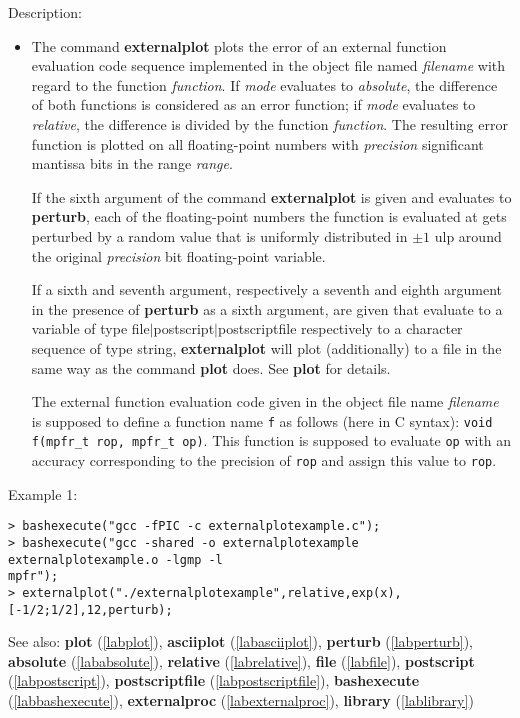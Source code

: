 \noindent Description: \begin{itemize}

\item The command \textbf{externalplot} plots the error of an external function
   evaluation code sequence implemented in the object file named
   \emph{filename} with regard to the function \emph{function}.  If \emph{mode}
   evaluates to \emph{absolute}, the difference of both functions is
   considered as an error function; if \emph{mode} evaluates to \emph{relative},
   the difference is divided by the function \emph{function}. The resulting
   error function is plotted on all floating-point numbers with
   \emph{precision} significant mantissa bits in the range \emph{range}. 
    
   If the sixth argument of the command \textbf{externalplot} is given and evaluates to
   \textbf{perturb}, each of the floating-point numbers the function is evaluated at gets perturbed by a
   random value that is uniformly distributed in $\pm1$ ulp
   around the original \emph{precision} bit floating-point variable.
    
   If a sixth and seventh argument, respectively a seventh and eighth
   argument in the presence of \textbf{perturb} as a sixth argument, are given
   that evaluate to a variable of type \textsf{file$|$postscript$|$postscriptfile} respectively to a
   character sequence of type \textsf{string}, \textbf{externalplot} will plot
   (additionally) to a file in the same way as the command \textbf{plot}
   does. See \textbf{plot} for details.
    
   The external function evaluation code given in the object file name
   \emph{filename} is supposed to define a function name \texttt{f} as
   follows (here in C syntax): \texttt{void f(mpfr\_t rop, mpfr\_t op)}. 
   This function is supposed to evaluate \texttt{op} with an accuracy corresponding
   to the precision of \texttt{rop} and assign this value to
   \texttt{rop}.
\end{itemize}
\noindent Example 1: 
\begin{center}\begin{minipage}{15cm}\begin{Verbatim}[frame=single,commandchars=\\\|\~]
> bashexecute("gcc -fPIC -c externalplotexample.c");
> bashexecute("gcc -shared -o externalplotexample externalplotexample.o -lgmp -l
mpfr");
> externalplot("./externalplotexample",relative,exp(x),[-1/2;1/2],12,perturb);
\end{Verbatim}
\end{minipage}\end{center}
See also: \textbf{plot} (\ref{labplot}), \textbf{asciiplot} (\ref{labasciiplot}), \textbf{perturb} (\ref{labperturb}), \textbf{absolute} (\ref{lababsolute}), \textbf{relative} (\ref{labrelative}), \textbf{file} (\ref{labfile}), \textbf{postscript} (\ref{labpostscript}), \textbf{postscriptfile} (\ref{labpostscriptfile}), \textbf{bashexecute} (\ref{labbashexecute}), \textbf{externalproc} (\ref{labexternalproc}), \textbf{library} (\ref{lablibrary})
